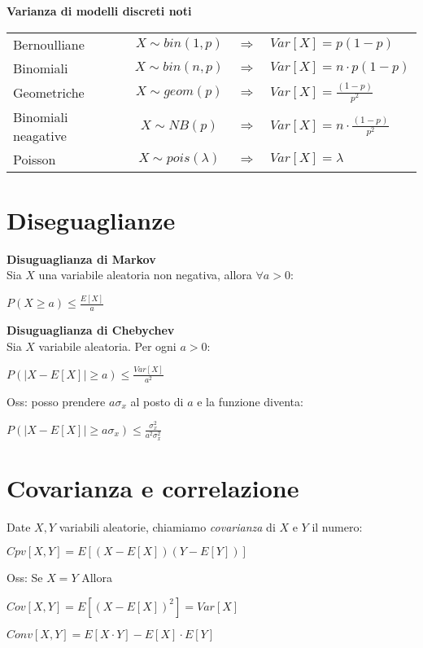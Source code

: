 \documentclass[12pt, a4paper]{article}
\begin{document}
\textbf{Varianza di modelli discreti noti}\\
\begin{tabular}{l c c l}
   Bernoulliane & $X\sim bin(1,p)$ & $\Rightarrow$ & $Var[X]= p(1-p)$\\
   Binomiali & $X\sim bin(n,p)$ & $\Rightarrow$ & $Var[X]= n\cdot p(1-p)$\\
   Geometriche & $X\sim geom(p)$ & $\Rightarrow$ & $Var[X]= \frac{(1-p)}{p^{2}}$\\
   Binomiali neagative & $X\sim NB(p)$ & $\Rightarrow$ & $Var[X]= n\cdot\frac{(1-p)}{p^{2}}$\\
   Poisson & $X\sim pois(\lambda)$ & $\Rightarrow$ & $Var[X]= \lambda$\\
\end{tabular}

\section{Diseguaglianze}

\textbf{Disuguaglianza di Markov}\\ Sia $X$ una variabile aleatoria non negativa, allora $\forall a>0$:
\begin{center}
    $P(X\geq a) \leq \frac{E[X]}{a}$
\end{center}

\textbf{Disuguaglianza di Chebychev}\\ Sia $X$ variabile aleatoria. Per ogni $a>0$:
\begin{center}
    $P(|X-E[X]|\geq a)\leq \frac{Var[X]}{a^{2}}$
\end{center}

Oss: posso prendere $a\sigma_{x}$ al posto di $a$ e la funzione diventa:
\begin{center}
    $P(|X-E[X]|\geq a\sigma_{x})\leq \frac{\sigma^{2}_{x}}{a^{2}\sigma_{x}^{2}}$
\end{center}

\section{Covarianza e correlazione}
Date $X,Y$ variabili aleatorie, chiamiamo \textit{covarianza} di $X$ e $Y$ il numero:
\begin{center}
    $Cpv[X,Y]=E[(X-E[X])(Y-E[Y])]$
\end{center}

Oss: Se $X=Y$ Allora
\begin{center}
    $Cov[X,Y]=E[(X-E[X])^2]=Var[X]$

    $Conv[X,Y]=E[X\cdot Y]-E[X]\cdot E[Y]$
\end{center}
\end{document}
